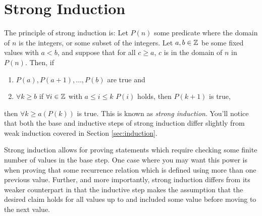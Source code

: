\guard
\section{Strong Induction}
\label{sec:strongInduction}



The principle of strong induction is:
Let $P(n)$ some predicate where the domain of $n$ is the integers, or some subset of the integers.
Let $a,b\in\mathbb{Z}$ be some fixed values with $a<b$, and suppose that for all $c\geq a$, $c$ is in the domain of $n$ in $P(n)$.
Then, if
\begin{enumerate}
  \item $P(a),P(a+1),\dots,P(b)$ are true and
  \item $\forall k\geq b$ if $\forall i\in\mathbb{Z}$ with $a\leq i\leq k$ $P(i)$ holds, then $P(k+1)$ is true,
\end{enumerate}
then $\forall k\geq a(P(k))$ is true.
This is known as \emph{strong induction}.
You'll notice that both the base and inductive steps of strong induction differ slightly from weak induction covered in Section \ref{sec:induction}.

Strong induction allows for proving statements which require checking some finite number of values in the base step.
One case where you may want this power is when proving that some recurrence relation which is defined using more than one previous value.
Further, and more importantly, strong induction differs from its weaker counterpart in that the inductive step makes the assumption that the desired claim holds for all values up to and included some value before moving to the next value.




